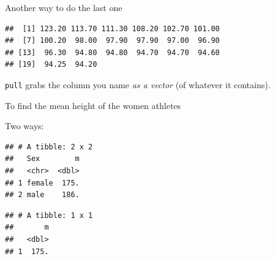 \documentclass[ignorenonframetext,]{beamer}
\newenvironment{Shaded}{\begin{snugshade}}{\end{snugshade}}
\newcommand{\DataTypeTok}[1]{\textcolor[rgb]{0.13,0.29,0.53}{#1}}
\newcommand{\DecValTok}[1]{\textcolor[rgb]{0.00,0.00,0.81}{#1}}
\newcommand{\KeywordTok}[1]{\textcolor[rgb]{0.13,0.29,0.53}{\textbf{#1}}}
\newcommand{\NormalTok}[1]{#1}
\newcommand{\OperatorTok}[1]{\textcolor[rgb]{0.81,0.36,0.00}{\textbf{#1}}}
\newcommand{\StringTok}[1]{\textcolor[rgb]{0.31,0.60,0.02}{#1}}
\begin{document}
\begin{frame}[fragile]{Another way to do the last one}
\protect\hypertarget{another-way-to-do-the-last-one}{}

\begin{Shaded}
\end{Shaded}

\begin{verbatim}
##  [1] 123.20 113.70 111.30 108.20 102.70 101.00
##  [7] 100.20  98.00  97.90  97.90  97.00  96.90
## [13]  96.30  94.80  94.80  94.70  94.70  94.60
## [19]  94.25  94.20
\end{verbatim}

\texttt{pull} grabs the column you name \emph{as a vector} (of whatever
it contains).

\end{frame}

\begin{frame}[fragile]{To find the mean height of the women athletes}
\protect\hypertarget{to-find-the-mean-height-of-the-women-athletes}{}

Two ways:

\small

\begin{Shaded}
\end{Shaded}

\begin{verbatim}
## # A tibble: 2 x 2
##   Sex        m
##   <chr>  <dbl>
## 1 female  175.
## 2 male    186.
\end{verbatim}

\begin{Shaded}
\end{Shaded}

\begin{verbatim}
## # A tibble: 1 x 1
##       m
##   <dbl>
## 1  175.
\end{verbatim}

\normalsize

\end{frame}
\end{document}
